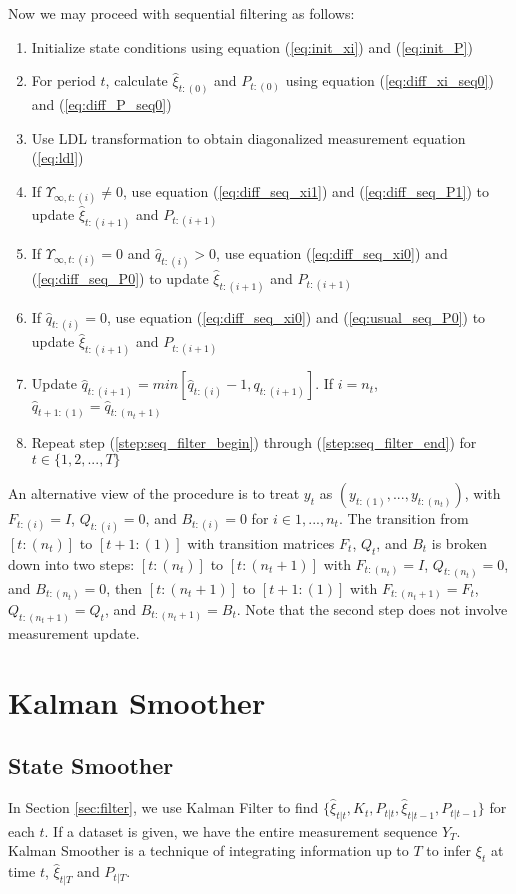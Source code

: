 \documentclass[10pt, titlepage]{article}
\newenvironment{boenumerate}
    {\begin{enumerate}\renewcommand\labelenumi{\textbf\theenumi}}
    {\end{enumerate}}
\numberwithin{equation}{section}
\begin{document}
Now we may proceed with sequential filtering as follows:
\begin{boenumerate}
    \item Initialize state conditions using equation (\ref{eq:init_xi}) and (\ref{eq:init_P}) 
    \item For period $t$, calculate $\hat{\xi}_{t:(0)}$ and $P_{t:{(0)}}$ using equation (\ref{eq:diff_xi_seq0}) and (\ref{eq:diff_P_seq0}) \label{step:seq_filter_begin}
    \item Use LDL transformation to obtain diagonalized measurement equation (\ref{eq:ldl})
    \item If $\Upsilon_{\infty,t:(i)}\neq0$, use equation (\ref{eq:diff_seq_xi1}) and (\ref{eq:diff_seq_P1}) to update $\hat{\xi}_{t:(i+1)}$ and $P_{t:(i+1)}$
    \item If $\Upsilon_{\infty,t:(i)}=0$ and $\hat{q}_{t:(i)}>0$, use equation (\ref{eq:diff_seq_xi0}) and (\ref{eq:diff_seq_P0}) to update $\hat{\xi}_{t:(i+1)}$ and $P_{t:(i+1)}$ 
    \item If $\hat{q}_{t:(i)}=0$, use equation (\ref{eq:diff_seq_xi0}) and (\ref{eq:usual_seq_P0}) to update $\hat{\xi}_{t:(i+1)}$ and $P_{t:(i+1)}$ 
    \item Update $\hat{q}_{t:(i+1)} = min[\hat{q}_{t:(i)}-1, q_{t:(i+1)}]$. If $i=n_t$, $\hat{q}_{t+1:(1)}=\hat{q}_{t:(n_t+1)}$ \label{step:seq_filter_end}
    \item Repeat step (\ref{step:seq_filter_begin}) through (\ref{step:seq_filter_end}) for $t\in\{1,2,...,T\}$
\end{boenumerate}

An alternative view of the procedure is to treat $y_t$ as $(y_{t:(1)},...,y_{t:(n_t)})$, with $F_{t:(i)}=I$, $Q_{t:(i)}=0$, and $B_{t:(i)}=0$ for $i\in{1,...,n_t}$. The transition from $[t:(n_t)]$ to $[t+1:(1)]$ with transition matrices $F_t$, $Q_t$, and $B_t$ is broken down into two steps: $[t:(n_t)]$ to $[t:(n_t+1)]$ with $F_{t:(n_t)}=I$, $Q_{t:(n_t)}=0$, and $B_{t:(n_t)}=0$, then $[t:(n_t+1)]$ to $[t+1:(1)]$ with $F_{t:(n_t+1)}=F_t$, $Q_{t:(n_t+1)}=Q_t$, and $B_{t:(n_t+1)}=B_t$. Note that the second step does not involve measurement update.

\section{Kalman Smoother} \label{sec:smoother}
\subsection{State Smoother}
In Section \ref{sec:filter}, we use Kalman Filter to find $\{\hat{\xi}_{t|t}, K_t, P_{t|t}, \hat{\xi}_{t|t-1}, P_{t|t-1}\}$ for each $t$. If a dataset is given, we have the entire measurement sequence $Y_T$. Kalman Smoother is a technique of integrating information up to $T$ to infer $\xi_t$ at time $t$, $\hat{\xi}_{t|T}$ and $P_{t|T}$. 
\end{document}
